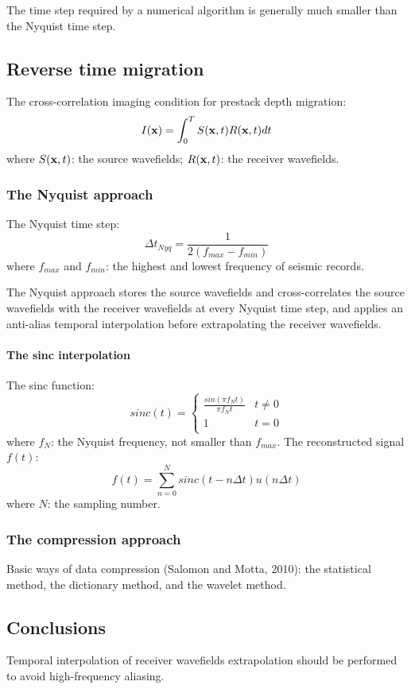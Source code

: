 The time step required by a numerical algorithm is generally much smaller
than the Nyquist time step.

\subsection{Reverse time migration}
The cross-correlation imaging condition for prestack depth migration:
\[ I(\mathbf{x}) = \int_0^T S(\mathbf{x}, t) R(\mathbf{x}, t) dt \]
where $S(\mathbf{x}, t)$: the source wavefields;
$R(\mathbf{x}, t)$: the receiver wavefields.

\subsubsection{The Nyquist approach}
The Nyquist time step:
\[ \Delta t_{Nyq} = \frac{1}{2 (f_{max} - f_{min})} \]
where $f_{max}$ and $f_{min}$: the highest and lowest frequency
of seismic records.

The Nyquist approach 
stores the source wavefields and cross-correlates the source wavefields
with the receiver wavefields at every Nyquist time step,
and applies an anti-alias temporal interpolation
before extrapolating the receiver wavefields.

\paragraph{The sinc interpolation}
The sinc function:
\[ sinc(t) = \left\{
  \begin{array}{cc}
    \frac{sin(\pi f_N t)}{\pi f_N t} & t \neq 0 \\
    1                                & t = 0 \\
  \end{array}
\right. \]
where $f_N$: the Nyquist frequency, not smaller than $f_{max}$.
The reconstructed signal $f(t)$:
\[ f(t) = \sum_{n = 0}^N sinc(t - n\Delta t) u(n\Delta t) \]
where $N$: the sampling number.

\subsubsection{The compression approach}
Basic ways of data compression (Salomon and Motta, 2010):
the statistical method, the dictionary method, and the wavelet method.

\subsection{Conclusions}
Temporal interpolation of receiver wavefields extrapolation
should be performed to avoid high-frequency aliasing.


